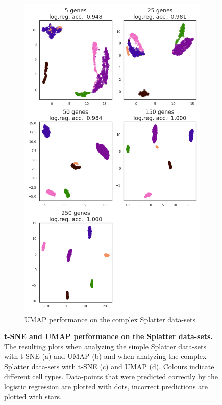 \begin{figure}[h]
\begin{subfigure}{.3\textwidth}
  \includegraphics[width=\linewidth]{figs/UMAP_complex.png}
  \caption{\small UMAP performance on the complex Splatter data-sets}
  \label{fig:umap_complex}
\end{subfigure}
\small
\caption[t-SNE and UMAP performance on the Splatter data-sets.]{\small \textbf{t-SNE and UMAP performance on the Splatter data-sets.} \small The resulting plots when analyzing the simple Splatter data-sets with t-SNE (a) and UMAP (b) and when analyzing the complex Splatter data-sets with t-SNE (c) and UMAP (d). Colours indicate different cell types. Data-points that were predicted correctly by the logistic regression are plotted with dots, incorrect predictions are plotted with stars.}
\label{fig:baseline_splatter}
\end{figure}



